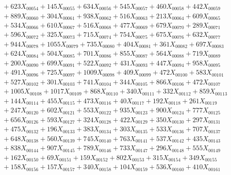 \documentclass[a4paper,10pt]{article}
\begin{document}
{\begin{align}
&\quad  + 623X_{00054} + 145X_{00055} + 634X_{00056} + 545X_{00057} + 460X_{00058} + 442X_{00059} \\[0.5ex]
&\quad  + 889X_{00060} + 304X_{00061} + 938X_{00062} + 516X_{00063} + 213X_{00064} + 609X_{00065} \\[0.5ex]
&\quad  + 534X_{00066} + 610X_{00067} + 516X_{00068} + 477X_{00069} + 679X_{00070} + 289X_{00071} \\[0.5ex]
&\quad  + 596X_{00072} + 325X_{00073} + 715X_{00074} + 754X_{00075} + 675X_{00076} + 632X_{00077} \\[0.5ex]
&\quad  + 944X_{00078} + 1055X_{00079} + 735X_{00080} + 404X_{00081} + 361X_{00082} + 697X_{00083} \\[0.5ex]
&\quad  + 624X_{00084} + 504X_{00085} + 701X_{00086} + 855X_{00087} + 564X_{00088} + 719X_{00089} \\[0.5ex]
&\quad  + 200X_{00090} + 699X_{00091} + 522X_{00092} + 431X_{00093} + 447X_{00094} + 958X_{00095} \\[0.5ex]
&\quad  + 491X_{00096} + 725X_{00097} + 1009X_{00098} + 409X_{00099} + 472X_{00100} + 583X_{00101} \\[0.5ex]
&\quad  + 527X_{00102} + 301X_{00103} + 741X_{00104} + 344X_{00105} + 866X_{00106} + 472X_{00107} \\[0.5ex]
&\quad  + 1005X_{00108} + 1017X_{00109} + 868X_{00110} + 340X_{00111} + 332X_{00112} + 859X_{00113} \\[0.5ex]
&\quad  + 144X_{00114} + 455X_{00115} + 473X_{00116} + 40X_{00117} + 192X_{00118} + 261X_{00119} \\[0.5ex]
&\quad  + 247X_{00120} + 602X_{00121} + 553X_{00122} + 935X_{00123} + 900X_{00124} + 777X_{00125} \\[0.5ex]
&\quad  + 656X_{00126} + 593X_{00127} + 324X_{00128} + 422X_{00129} + 350X_{00130} + 297X_{00131} \\[0.5ex]
&\quad  + 475X_{00132} + 196X_{00133} + 383X_{00134} + 303X_{00135} + 533X_{00136} + 707X_{00137} \\[0.5ex]
&\quad  + 648X_{00138} + 560X_{00139} + 745X_{00140} + 763X_{00141} + 537X_{00142} + 435X_{00143} \\[0.5ex]
&\quad  + 838X_{00144} + 907X_{00145} + 789X_{00146} + 733X_{00147} + 296X_{00148} + 555X_{00149} \\[0.5ex]
&\quad  + 162X_{00150} + 69X_{00151} + 159X_{00152} + 802X_{00153} + 315X_{00154} + 349X_{00155} \\[0.5ex]
&\quad  + 158X_{00156} + 157X_{00157} + 340X_{00158} + 104X_{00159} + 536X_{00160} + 410X_{00161} \\[0.5ex]

\end{align}}
\end{document}
